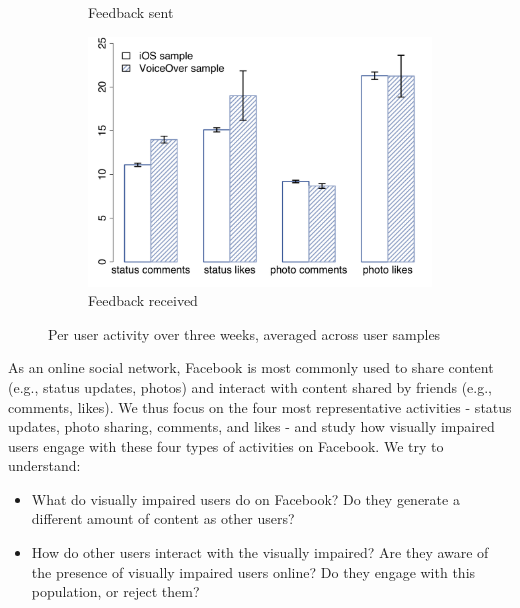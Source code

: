 \documentclass{sigchi}
\begin{document}
\begin{figure}[t]
\begin{subfigure}[b]{0.35\textwidth}
    \caption{Feedback sent}
    \label{fig:feedback_send}
 \end{subfigure}
\begin{subfigure}[b]{0.38\textwidth}
    \includegraphics[width=\columnwidth]{feedback_receive.pdf}
    \caption{Feedback received}
    \label{fig:feedback_receive}
 \end{subfigure}
\caption{Per user activity over three weeks, averaged across user samples}
\label{fig:activity}
\end{figure}


As an online social network, Facebook is most commonly used to share content (e.g., status updates, photos) and interact with content shared by friends (e.g., comments, likes).  We thus focus on the four most representative activities - status updates, photo sharing, comments, and likes - and study how visually impaired users engage with these four types of activities on Facebook. We try to understand:

\begin{itemize}
\item What do visually impaired users do on Facebook? Do they generate a different amount of content as other users?
\item How do other users interact with the visually impaired? Are they aware of the presence of visually impaired users online? Do they engage with this population, or reject them?
\end{itemize}
\end{document}
